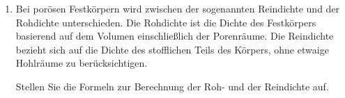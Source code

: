 \documentclass[a4paper,11pt]{article}
\newif\ifshowme
\begin{document}
\begin{enumerate}[leftmargin=6mm,font={\bfseries \sffamily \color{uniblau!75!black}},label=\alph*)]
{
}











\color{miudiutex}
\ifshowme
\antwort{
In aufsteigender Reihenfolge: Fett, Wasser, Protein, Stärke, Salz
}
\pagebreak
\else
\fi

\item Bei porösen Festkörpern wird zwischen der sogenannten Reindichte und der Rohdichte unterschieden. Die Rohdichte ist die Dichte des Festkörpers basierend auf dem Volumen einschließlich der Porenräume. Die Reindichte bezieht sich auf die Dichte des stofflichen Teils des Körpers, ohne etwaige Hohlräume zu berücksichtigen. 
 
Stellen Sie die Formeln zur Berechnung der Roh- und der Reindichte auf.
\ifshowme
\antwort{
\vspace*{-4mm}
\begin{align*}
{\mathlarger \rho}_{roh} &= \frac{m}{V_{Stoff} + V_{por}} \\
{\mathlarger \rho}_{rein} &= \frac{m}{V_{Stoff}}
\end{align*}
$m$ : Masse des Festkörpers \par 
$V_{Stoff}$ : Volumen des Stoffes \par 
$ V_{por}$ : Volumen der Poren
}
\else
\fi




\end{enumerate}
\end{document}

